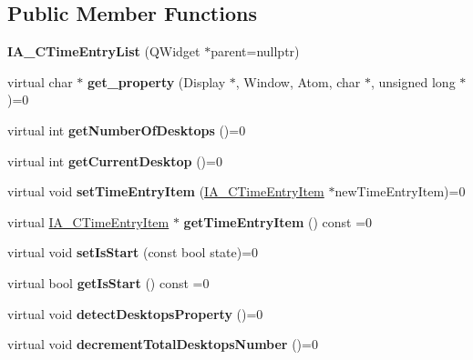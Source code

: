 \subsection*{Public Member Functions}
\begin{DoxyCompactItemize}
\item 
\mbox{\label{classIA__CTimeEntryList_a8890211043932977871bac1d9f1324ce}} 
{\bfseries I\+A\+\_\+\+C\+Time\+Entry\+List} (Q\+Widget $\ast$parent=nullptr)
\item 
\mbox{\label{classIA__CTimeEntryList_a9c52cd6cfd6f8db9cfd0585b67b64bfb}} 
virtual char $\ast$ {\bfseries get\+\_\+property} (Display $\ast$, Window, Atom, char $\ast$, unsigned long $\ast$)=0
\item 
\mbox{\label{classIA__CTimeEntryList_adace93cf8cb107b2ec4222d4f011dbc1}} 
virtual int {\bfseries get\+Number\+Of\+Desktops} ()=0
\item 
\mbox{\label{classIA__CTimeEntryList_abd5d1a0aaa1d6ae59d6284cb729d07ba}} 
virtual int {\bfseries get\+Current\+Desktop} ()=0
\item 
\mbox{\label{classIA__CTimeEntryList_af5d9397056e8089ee9715cf8d4c98976}} 
virtual void {\bfseries set\+Time\+Entry\+Item} (\hyperlink{classIA__CTimeEntryItem}{I\+A\+\_\+\+C\+Time\+Entry\+Item} $\ast$new\+Time\+Entry\+Item)=0
\item 
\mbox{\label{classIA__CTimeEntryList_a1be860ff30ca8db73ec75d92600f68a6}} 
virtual \hyperlink{classIA__CTimeEntryItem}{I\+A\+\_\+\+C\+Time\+Entry\+Item} $\ast$ {\bfseries get\+Time\+Entry\+Item} () const =0
\item 
\mbox{\label{classIA__CTimeEntryList_a09a60884cc0432e0de8069ea4bb93920}} 
virtual void {\bfseries set\+Is\+Start} (const bool state)=0
\item 
\mbox{\label{classIA__CTimeEntryList_a91c9efe15b0882100bda9fa563cd5882}} 
virtual bool {\bfseries get\+Is\+Start} () const =0
\item 
\mbox{\label{classIA__CTimeEntryList_a548f3ca4e3c3aaaf05b43bf3289f0b1f}} 
virtual void {\bfseries detect\+Desktops\+Property} ()=0
\item 
\mbox{\label{classIA__CTimeEntryList_a24b34545f73e31fecadc7dbdfc556d78}} 
virtual void {\bfseries decrement\+Total\+Desktops\+Number} ()=0
\end{DoxyCompactItemize}
